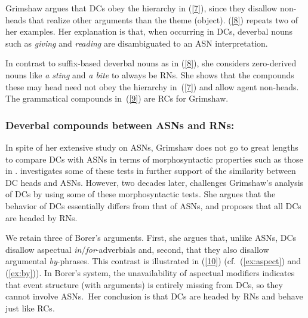 \documentclass[output=paper]{langsci/langscibook}
\begin{document}
\begin{exe}
\end{exe}

Grimshaw argues that DCs obey the hierarchy in (\ref{7}), since they disallow non-heads that realize other arguments than the theme (object). (\ref{8}) repeats two of her examples. Her explanation is that, when occurring in DCs, deverbal nouns such as  \textit{giving} and \textit{reading} are disambiguated to an ASN interpretation. 
\begin{exe}
\end{exe}
In contrast to suffix-based deverbal nouns as in (\ref{8}), she considers zero-derived nouns like \textit{a sting} and \textit{a bite} to always be RNs. She shows that the compounds these may head need not obey the hierarchy in~(\ref{7}) and allow agent non-heads. The grammatical compounds in~(\ref{9}) are RCs for Grimshaw. 
\begin{exe}
\end{exe}

\subsubsection{Deverbal compounds between ASNs and RNs: \cite{borer:13}}
In spite of her extensive study on ASNs, Grimshaw does not go to great lengths to compare DCs with ASNs in terms of  morphosyntactic properties such as those in . \cite{disciullo:92} investigates some of these tests in further support of the similarity between DC heads and ASNs. However, two decades later, \cite{borer:13} challenges Grimshaw's analysis of DCs by using some of these morphosyntactic tests. She argues that the behavior of DCs essentially differs from that of ASNs, and proposes that all DCs are headed by RNs.

We retain three of Borer's arguments.
First, she argues that, unlike ASNs, DCs disallow aspectual \textit{in}/\textit{for}-adverbials and, second, that they also disallow argumental \textit{by}-phrases.
This contrast is illustrated in (\ref{10})  {(cf.\ (\ref{ex:aspect}) and (\ref{ex:by}))}.
In Borer's system, the unavailability of aspectual modifiers indicates that event structure (with arguments) is entirely missing from DCs, so they cannot involve ASNs.\ Her conclusion is that DCs are headed by RNs and behave just like RCs. 
\end{document}
